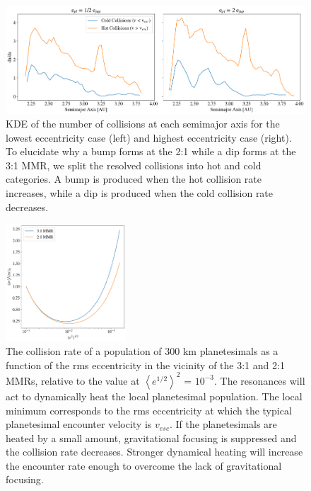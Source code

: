 \documentclass[onecolumn]{aastex63}
\begin{document}
\begin{figure}
    \begin{center}
    \includegraphics[width=\textwidth]{figures/coll_hist_hot_cold_a.png}
    \caption{KDE of the number of collisions at each semimajor axis for the lowest eccentricity case (left) and highest eccentricity case (right). To elucidate why a bump forms at the 2:1 while a dip forms at the 3:1 MMR, we split the resolved collisions into hot and cold categories. A bump is produced when the hot collision rate increases, while a dip is produced when the cold collision rate decreases.\label{fig:coll_hist_hot_cold_a}}
    \end{center}
\end{figure}

\begin{figure}
    \begin{center}
    \includegraphics[width=0.4\textwidth]{figures/coll_gf_vary.png}
    \caption{The collision rate of a population of 300 km planetesimals as a function of the rms eccentricity in the vicinity of the 3:1 and 2:1 MMRs, relative to the value at $\left< e^{1/2} \right>^{2}$ = $10^{-3}$. The resonances will act to dynamically heat the local planetesimal population. The local minimum corresponds to the rms eccentricity at which the typical planetesimal encounter velocity is $v_{esc}$. If the planetesimals are heated by a small amount, gravitational focusing is suppressed and the collision rate decreases. Stronger dynamical heating will increase the encounter rate enough to overcome the lack of gravitational focusing.\label{fig:coll_gf_varg}}
    \end{center}
\end{figure}
\end{document}

